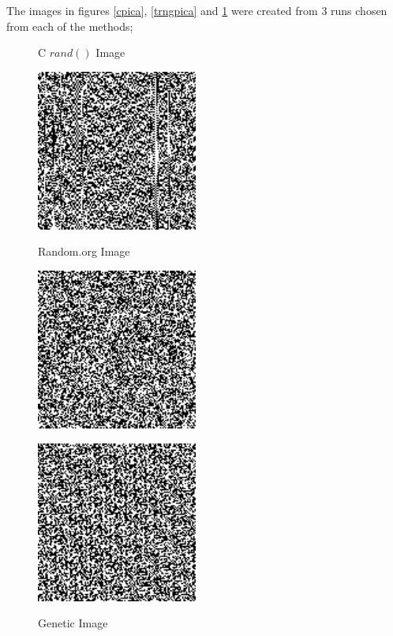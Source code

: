 \documentclass[a4paper,10.5pt]{article}
\begin{document}
The images in figures \ref{cpica}, \ref{trngpica} and \ref{geneticpica} were created from 3 runs chosen from each of the methods;
\begin{figure}[H]
\begin{minipage}{.35\textwidth}

\caption{C $rand()$ Image}
\includegraphics[keepaspectratio=true, height= 150pt]{crand.png}
\label{cpica}
\end{minipage}%
\begin{minipage}{.35\textwidth}

\caption{Random.org Image}
\includegraphics[keepaspectratio=true, height= 150pt]{randomorg.png}
\label{trngpica}
\end{minipage}%
\begin{minipage}{.35\textwidth}

\caption{Genetic Image}
\includegraphics[keepaspectratio=true, height= 150pt]{myrand.png}
\label{geneticpica}
\end{minipage}%
\end{figure}
\end{document}
